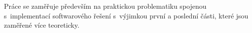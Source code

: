 Práce se zaměřuje především na praktickou problematiku spojenou s~implementací softwarového řešení s~výjimkou první a poslední části, které jsou zaměřené více teoreticky.






